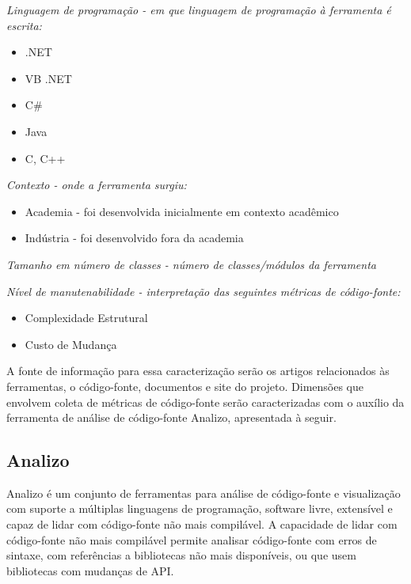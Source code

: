 \begin{description}

  \item {\it Linguagem de programação - em que linguagem de programação à ferramenta é escrita:}
    \begin{itemize}
      \item .NET
      \item VB .NET
      \item C\#
      \item Java
      \item C, C++
    \end{itemize}

  \item {\it Contexto - onde a ferramenta surgiu:}
    \begin{itemize}
      \item Academia - foi desenvolvida inicialmente em contexto acadêmico
      \item Indústria - foi desenvolvido fora da academia
    \end{itemize}

  \item {\it Tamanho em número de classes - número de classes/módulos da ferramenta}

  \item {\it Nível de manutenabilidade - interpretação das seguintes métricas de código-fonte:}
    \begin{itemize}
      \item Complexidade Estrutural
      \item Custo de Mudança
    \end{itemize}

\end{description}

A fonte de informação para essa caracterização serão os artigos relacionados às
ferramentas, o código-fonte, documentos e site do projeto. Dimensões que
envolvem coleta de métricas de código-fonte serão caracterizadas com o auxílio
da ferramenta de análise de código-fonte Analizo, apresentada à seguir.

\subsection{Analizo} \label{analizo}

Analizo é um conjunto de ferramentas para análise de código-fonte e
visualização com suporte a múltiplas linguagens de programação, software livre,
extensível e capaz de lidar com código-fonte não mais compilável. A capacidade
de lidar com código-fonte não mais compilável permite analisar código-fonte
com erros de sintaxe, com referências a bibliotecas não mais disponíveis, ou
que usem bibliotecas com mudanças de API.

